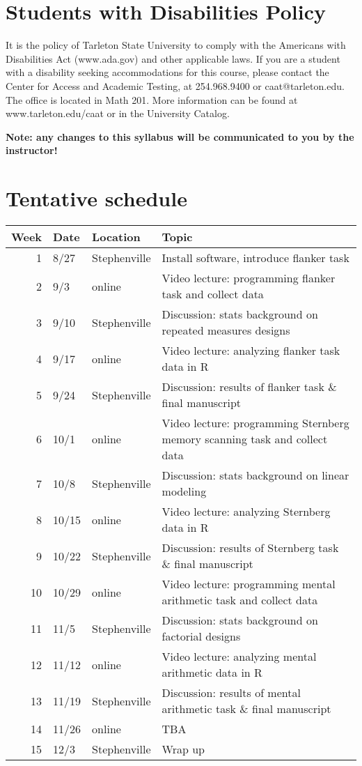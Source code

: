 \documentclass[10pt]{article}
\begin{document}
\section*{Students with Disabilities Policy}
\label{sec-10}

It is the policy of Tarleton State University to comply with the Americans with Disabilities  Act (www.ada.gov) and other applicable laws.  If you are a student with a disability seeking accommodations for this course, please contact the Center for Access and Academic Testing, at 254.968.9400 or caat@tarleton.edu. The office is located in Math 201. More information can be found at www.tarleton.edu/caat or in the University Catalog.​

\textbf{Note:  any changes to this syllabus will be communicated to you by the instructor!}

\section*{Tentative schedule}
\label{sec-11}

\begin{center}
\begin{tabular}{rlll}
Week & Date & Location & Topic\\
\hline
1 & 8/27 & Stephenville & Install software, introduce flanker task\\
2 & 9/3 & online & Video lecture: programming flanker task and collect data\\
3 & 9/10 & Stephenville & Discussion: stats background on repeated measures designs\\
4 & 9/17 & online & Video lecture: analyzing flanker task data in R\\
5 & 9/24 & Stephenville & Discussion: results of flanker task \& final manuscript\\
6 & 10/1 & online & Video lecture: programming Sternberg memory scanning task and collect data\\
7 & 10/8 & Stephenville & Discussion: stats background on linear modeling\\
8 & 10/15 & online & Video lecture: analyzing Sternberg data in R\\
9 & 10/22 & Stephenville & Discussion: results of Sternberg task \& final manuscript\\
10 & 10/29 & online & Video lecture: programming mental arithmetic task and collect data\\
11 & 11/5 & Stephenville & Discussion: stats background on factorial designs\\
12 & 11/12 & online & Video lecture: analyzing mental arithmetic data in R\\
13 & 11/19 & Stephenville & Discussion: results of mental arithmetic task \& final manuscript\\
14 & 11/26 & online & TBA\\
15 & 12/3 & Stephenville & Wrap up\\
\end{tabular}
\end{center}
\end{document}
